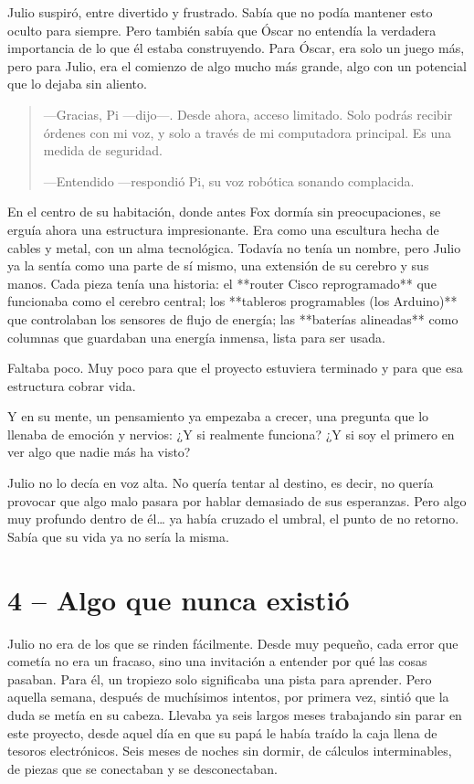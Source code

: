 \documentclass[a4paper,12pt]{book}
\begin{document}
Julio suspiró, entre divertido y frustrado. Sabía que no podía mantener esto oculto para siempre. Pero también sabía que Óscar no entendía la verdadera importancia de lo que él estaba construyendo. Para Óscar, era solo un juego más, pero para Julio, era el comienzo de algo mucho más grande, algo con un potencial que lo dejaba sin aliento.

\begin{quote}
    —Gracias, Pi —dijo—. Desde ahora, acceso limitado. Solo podrás recibir órdenes con mi voz, y solo a través de mi computadora principal. Es una medida de seguridad.

    —Entendido —respondió Pi, su voz robótica sonando complacida.
\end{quote}

En el centro de su habitación, donde antes Fox dormía sin preocupaciones, se erguía ahora una estructura impresionante. Era como una escultura hecha de cables y metal, con un alma tecnológica. Todavía no tenía un nombre, pero Julio ya la sentía como una parte de sí mismo, una extensión de su cerebro y sus manos. Cada pieza tenía una historia: el **router Cisco reprogramado** que funcionaba como el cerebro central; los **tableros programables (los Arduino)** que controlaban los sensores de flujo de energía; las **baterías alineadas** como columnas que guardaban una energía inmensa, lista para ser usada.

Faltaba poco. Muy poco para que el proyecto estuviera terminado y para que esa estructura cobrar vida.

Y en su mente, un pensamiento ya empezaba a crecer, una pregunta que lo llenaba de emoción y nervios: ¿Y si realmente funciona? ¿Y si soy el primero en ver algo que nadie más ha visto?

Julio no lo decía en voz alta. No quería tentar al destino, es decir, no quería provocar que algo malo pasara por hablar demasiado de sus esperanzas. Pero algo muy profundo dentro de él… ya había cruzado el umbral, el punto de no retorno. Sabía que su vida ya no sería la misma.
\cleardoublepage %

\chapter*{4 – Algo que nunca existió}

Julio no era de los que se rinden fácilmente. Desde muy pequeño, cada error que cometía no era un fracaso, sino una invitación a entender por qué las cosas pasaban. Para él, un tropiezo solo significaba una pista para aprender. Pero aquella semana, después de muchísimos intentos, por primera vez, sintió que la duda se metía en su cabeza. Llevaba ya seis largos meses trabajando sin parar en este proyecto, desde aquel día en que su papá le había traído la caja llena de tesoros electrónicos. Seis meses de noches sin dormir, de cálculos interminables, de piezas que se conectaban y se desconectaban.
\end{document}
